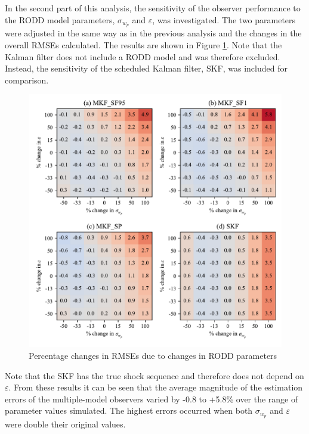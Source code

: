 In the second part of this analysis, the sensitivity of the observer performance to the \gls{RODD} model parameters, $\sigma_{w_p}$ and $\varepsilon$, was investigated. The two parameters were adjusted in the same way as in the previous analysis and the changes in the overall \gls{RMSE}s calculated. The results are shown in Figure \ref{fig:grind1-obs-sim-sens-rod-y-est}. Note that the Kalman filter does not include a \gls{RODD} model and was therefore excluded. Instead, the sensitivity of the scheduled Kalman filter, \gls{SKF}, was included for comparison.
\begin{figure}[htp]
	\centering
	\includegraphics[width=15cm]{images/rod_obs_sim_sens_rod_4obs_RMSE_y_est.pdf}
	\caption{Percentage changes in RMSEs due to changes in \gls{RODD} parameters}
	\label{fig:grind1-obs-sim-sens-rod-y-est}
\end{figure}
Note that the \gls{SKF} has the true shock sequence and therefore does not depend on $\varepsilon$. From these results it can be seen that the average magnitude of the estimation errors of the multiple-model observers varied by -0.8 to +5.8\% over the range of parameter values simulated. The highest errors occurred when both $\sigma_{w_p}$ and $\varepsilon$ were double their original values.
